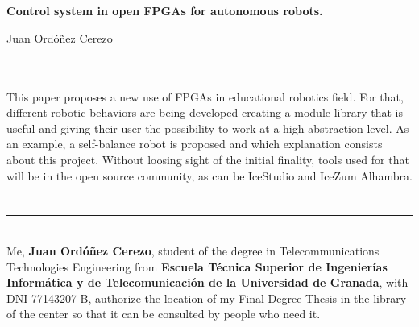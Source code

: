 \chapter*{}






\cleardoublepage
\thispagestyle{empty}

\begin{center}
{\large\bfseries  Control system in open FPGAs for autonomous robots.}\\
\end{center}
\begin{center}
Juan Ordóñez Cerezo\\
\end{center}

\\

\vspace{0.7cm}
\\

This paper proposes a new use of FPGAs in educational robotics field. For that, different robotic behaviors are being developed creating a module library that is useful and giving their user the possibility to work at a high abstraction level. As an example, a self-balance robot is proposed and which explanation consists about this project. Without loosing sight of the initial finality, tools used for that will be in the open source community, as can be IceStudio and IceZum Alhambra.
\cleardoublepage

\chapter*{}
\thispagestyle{empty}

\noindent\rule[-1ex]{\textwidth}{2pt}\\[4.5ex]

Me, \textbf{Juan Ordóñez Cerezo}, student of the degree in Telecommunications Technologies Engineering from \textbf{Escuela Técnica Superior
de Ingenierías Informática y de Telecomunicación de la Universidad de Granada}, with DNI 77143207-B, authorize the location of my Final Degree Thesis in the library of the center so that it can be consulted by people who need it.

